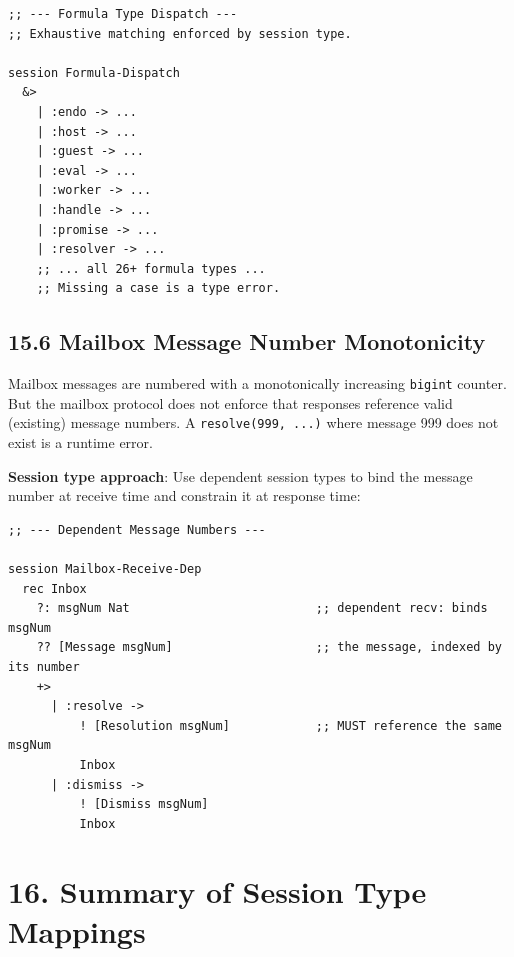 \documentclass[11pt]{article}
\begin{document}
\begin{verbatim}
;; --- Formula Type Dispatch ---
;; Exhaustive matching enforced by session type.

session Formula-Dispatch
  &>
    | :endo -> ...
    | :host -> ...
    | :guest -> ...
    | :eval -> ...
    | :worker -> ...
    | :handle -> ...
    | :promise -> ...
    | :resolver -> ...
    ;; ... all 26+ formula types ...
    ;; Missing a case is a type error.
\end{verbatim}
\subsection{15.6 Mailbox Message Number Monotonicity}
\label{sec:org0aaae0f}

Mailbox messages are numbered with a monotonically increasing \texttt{bigint}
counter. But the mailbox protocol does not enforce that responses reference
valid (existing) message numbers. A \texttt{resolve(999, ...)} where message 999
does not exist is a runtime error.

\textbf{Session type approach}: Use dependent session types to bind the message
number at receive time and constrain it at response time:

\begin{verbatim}
;; --- Dependent Message Numbers ---

session Mailbox-Receive-Dep
  rec Inbox
    ?: msgNum Nat                          ;; dependent recv: binds msgNum
    ?? [Message msgNum]                    ;; the message, indexed by its number
    +>
      | :resolve ->
          ! [Resolution msgNum]            ;; MUST reference the same msgNum
          Inbox
      | :dismiss ->
          ! [Dismiss msgNum]
          Inbox
\end{verbatim}
\section{16. Summary of Session Type Mappings}
\label{sec:org8a011d1}
\end{document}
